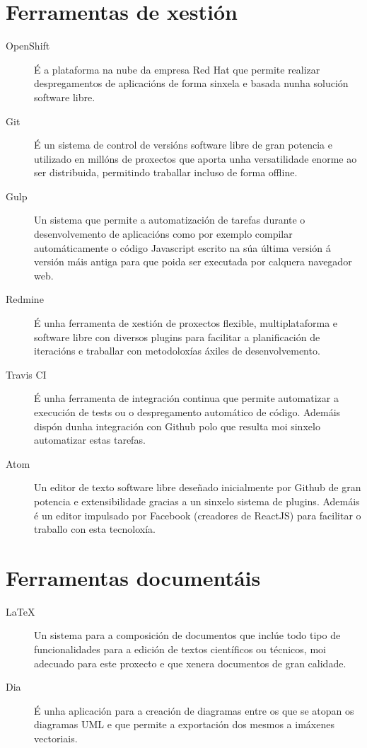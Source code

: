   \section{Ferramentas de xestión}

  \begin{description}
   \item [OpenShift] É a plataforma na nube da empresa Red Hat que permite 
realizar despregamentos de aplicacións de forma sinxela e basada nunha solución software 
libre.
   \item [Git] É un sistema de control de versións software libre de gran potencia e 
utilizado en millóns de proxectos que aporta unha versatilidade enorme ao ser 
distribuida, permitindo traballar incluso de forma offline.
   \item [Gulp] Un sistema que permite a automatización de tarefas durante o 
desenvolvemento de aplicacións como por exemplo compilar automáticamente o código 
Javascript escrito na súa última versión á versión máis antiga para que poida ser 
executada por calquera navegador web.
   \item [Redmine] É unha ferramenta de xestión de proxectos flexible, multiplataforma e 
software libre con diversos plugins para facilitar a planificación de iteracións e 
traballar con metodoloxías áxiles de desenvolvemento.
   \item [Travis CI] É unha ferramenta de integración continua que permite automatizar a 
execución de tests ou o despregamento automático de código. Ademáis dispón dunha 
integración con Github polo que resulta moi sinxelo automatizar estas tarefas.
   \item [Atom] Un editor de texto software libre deseñado inicialmente por Github de 
gran potencia e extensibilidade gracias a un sinxelo sistema de plugins. Ademáis é un 
editor impulsado por Facebook (creadores de ReactJS) para facilitar o traballo con esta 
tecnoloxía.

  \end{description}

  \section{Ferramentas documentáis}

  \begin{description}
   \item [LaTeX] Un sistema para a composición de documentos que inclúe todo tipo de 
funcionalidades para a edición de textos científicos ou técnicos, moi adecuado para este 
proxecto e que xenera documentos de gran calidade.
   \item [Dia] É unha aplicación para a creación de diagramas entre os que se atopan os 
diagramas UML e que permite a exportación dos mesmos a imáxenes vectoriais.
  \end{description}

  
  
  